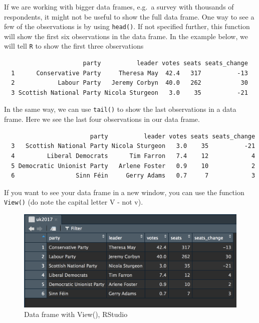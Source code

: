\documentclass[12pt,oneside]{reedthesis}
\theoremstyle{definition}
\theoremstyle{definition}
\theoremstyle{definition}
\theoremstyle{remark}
\begin{document}
  If we are working with bigger data frames, e.g.~a survey with thousands
  of respondents, it might not be useful to show the full data frame. One
  way to see a few of the observations is by using \texttt{head()}. If not
  specified further, this function will show the first six observations in
  the data frame. In the example below, we will tell \texttt{R} to show
  the first three observations
  \begin{Shaded}
  \begin{Highlighting}[]
  \NormalTok{)  }
  \end{Highlighting}
  \end{Shaded}
  \begin{verbatim}
                      party          leader votes seats seats_change
  1      Conservative Party     Theresa May  42.4   317          -13
  2            Labour Party   Jeremy Corbyn  40.0   262           30
  3 Scottish National Party Nicola Sturgeon   3.0    35          -21
  \end{verbatim}
  In the same way, we can use \texttt{tail()} to show the last
  observations in a data frame. Here we see the last four observations in
  our data frame.
  \begin{Shaded}
  \begin{Highlighting}[]
  \NormalTok{)  }
  \end{Highlighting}
  \end{Shaded}
  \begin{verbatim}
                        party          leader votes seats seats_change
  3   Scottish National Party Nicola Sturgeon   3.0    35          -21
  4         Liberal Democrats      Tim Farron   7.4    12            4
  5 Democratic Unionist Party   Arlene Foster   0.9    10            2
  6                 Sinn Féin     Gerry Adams   0.7     7            3
  \end{verbatim}
  If you want to see your data frame in a new window, you can use the
  function \texttt{View()} (do note the capital letter V - not v).
  \begin{Shaded}
  \begin{Highlighting}[]
  \end{Highlighting}
  \end{Shaded}
  \begin{figure}
  \includegraphics[width=14.69in,scale=0.65]{fig/View} \caption{Data frame with View(), RStudio}\label{fig:View}
  \end{figure}
\end{document}
